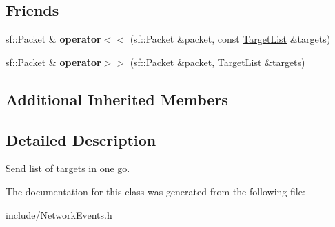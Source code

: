 \subsection*{Friends}
\begin{DoxyCompactItemize}
\item 
\hypertarget{class_target_list_a5e3531afd8ddbd5fa0a17a28ac892522}{sf\-::\-Packet \& {\bfseries operator$<$$<$} (sf\-::\-Packet \&packet, const \hyperlink{class_target_list}{Target\-List} \&targets)}\label{class_target_list_a5e3531afd8ddbd5fa0a17a28ac892522}

\item 
\hypertarget{class_target_list_ab08d74760edd840b452538362d85259f}{sf\-::\-Packet \& {\bfseries operator$>$$>$} (sf\-::\-Packet \&packet, \hyperlink{class_target_list}{Target\-List} \&targets)}\label{class_target_list_ab08d74760edd840b452538362d85259f}

\end{DoxyCompactItemize}
\subsection*{Additional Inherited Members}


\subsection{Detailed Description}
Send list of targets in one go. 



The documentation for this class was generated from the following file\-:\begin{DoxyCompactItemize}
\item 
include/Network\-Events.\-h\end{DoxyCompactItemize}
